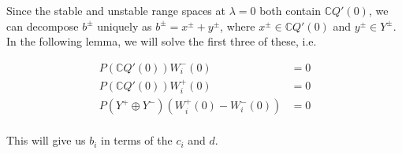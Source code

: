 \documentclass[12pt]{article}
\def\C{{\mathbb C}}
\begin{document}
Since the stable and unstable range spaces at $\lambda = 0$ both contain $\C Q'(0)$, we can decompose $b^\pm$ uniquely as $b^\pm = x^\pm + y^\pm$, where $x^\pm \in \C Q'(0)$ and $y^\pm \in Y^\pm$.\\

In the following lemma, we will solve the first three of these, i.e. 

\begin{align*}
P(\C Q'(0))W_i^-(0) &= 0 \\
P(\C Q'(0))W_i^+(0) &= 0 \\
P(Y^+ \oplus Y^-) ( W_i^+(0) - W_i^-(0) ) &= 0 \\
\end{align*}

This will give us $b_i$ in terms of the $c_i$ and $d$.\\

\end{document}
